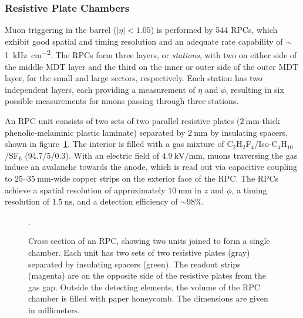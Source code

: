\subsubsection{Resistive Plate Chambers}
Muon triggering in the barrel ($|\eta|<1.05$) is performed by 544 RPCs, which exhibit good spatial and timing resolution and an adequate rate capability of $\sim$\SI[per-mode=symbol]{1}{\kilo\hertz\per\centi\meter\tothe{2}}. The RPCs form three layers, or \emph{stations}, with two on either side of the middle MDT layer and the third on the inner or outer side of the outer MDT layer, for the small and large sectors, respectively. Each station has two independent layers, each providing a measurement of $\eta$ and $\phi$, resulting in six possible measurements for muons passing through three stations. 

An RPC unit consists of two sets of two parallel resistive plates ($\SI{2}{\milli\meter}$-thick phenolic-melaminic plastic laminate) separated by $\SI{2}{\milli\meter}$ by insulating spacers, shown in figure~\ref{fig:ATLAS-MS-RPC-schematic}. The interior is filled with a gas mixture of C$_2$H$_2$F$_4$/Iso-C$_4$H$_{10}$/SF$_6$ (94.7/5/0.3). With an electric field of $\SI[per-mode=symbol]{4.9}{\kilo\volt\per\milli\meter}$, muons traversing the gas induce an avalanche towards the anode, which is read out via capacitive coupling to $25$--$\SI{35}{\milli\meter}$-wide copper strips on the exterior face of the RPC. The RPCs achieve a spatial resolution of approximately $\SI{10}{\milli\meter}$ in $z$ and $\phi$, a timing resolution of $\SI{1.5}{\nano\second}$, and a detection efficiency of $\sim 98\%$. 

\begin{figure}[htbp]
	\centering
	\caption{Cross section of an RPC, showing two units joined to form a single chamber. Each unit has two sets of two resistive plates (gray) separated by insulating spacers (green). The readout strips (magenta) are on the opposite side of the resistive plates from the gas gap. Outside the detecting elements, the volume of the RPC chamber is filled with paper honeycomb. The dimensions are given in millimeters.}
	\label{fig:ATLAS-MS-RPC-schematic}.
\end{figure}

